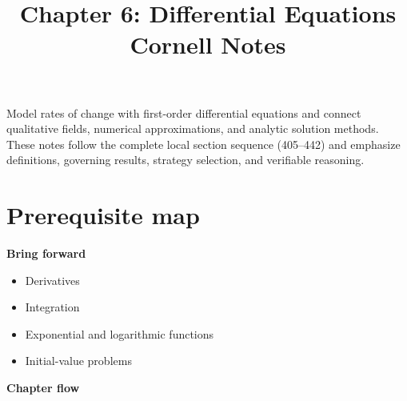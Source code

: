 \documentclass[11pt]{article}
\title{Chapter 6: Differential Equations\\[2mm]\large Cornell Notes}
\author{}
\date{}
\begin{document}
\maketitle
\thispagestyle{fancy}
\begin{orientationbox}
Model rates of change with first-order differential equations and connect qualitative fields, numerical approximations, and analytic solution methods. These notes follow the complete local section sequence (405--442) and emphasize definitions, governing results, strategy selection, and verifiable reasoning.
\end{orientationbox}

\section{Prerequisite map}
\begin{minipage}[t]{0.42\textwidth}
\textbf{Bring forward}
\begin{itemize}
\item Derivatives
\item Integration
\item Exponential and logarithmic functions
\item Initial-value problems
\end{itemize}
\end{minipage}\hfill
\begin{minipage}[t]{0.54\textwidth}
\textbf{Chapter flow}
\begin{center}
\end{center}
\end{minipage}
\end{document}
